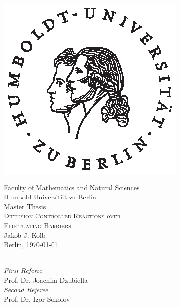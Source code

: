 \thispagestyle{empty}
\begin{center}
%
%
  {\large
  \centerline{\includegraphics[width=.4 \textwidth]{plots/husiegel_sw_op.eps}}%
\vspace*{0.5cm}
Faculty of Mathematics and Natural Sciences\\
Humbold Universit\"{a}t zu Berlin\\%
\vspace*{2cm}
{\Large Master Thesis}\\[0.5cm]
\textsc{\Huge{Diffusion Controlled Reactions over \\[.4 cm] Fluctuating Barriers}}\\[2cm]
    Jakob J. Kolb\\
Berlin, \today\\
 }
%
%
%
\vfill	
%
%
\rule{0mm}{1mm}\\   %

\textit{First Referee}\\ Prof. Dr. Joachim Dzubiella \\
\textit{Second Referee}\\ Prof. Dr. Igor Sokolov
\end{center}
\newpage 
\thispagestyle{empty}
\mbox{}
\newpage
